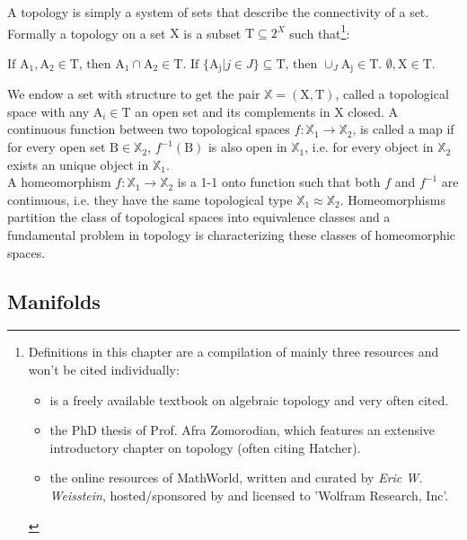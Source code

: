 A topology is simply a system of sets that describe the connectivity of a set.
Formally a topology on a set $\mathrm{X}$ is a subset $\mathrm{T} \subseteq 2^{X}$ such that\footnote{ Definitions in this chapter are a compilation of mainly three resources and won't be cited individually:\begin{itemize}
\item \citep[][]{Hatcher2002} is a freely available textbook on algebraic topology and very often cited.
\item \citep[][]{Zomorodian1996} the PhD thesis of Prof. Afra Zomorodian, which features an extensive introductory chapter on topology (often citing Hatcher).
\item \citep[][]{Weisstein2002} the online resources of MathWorld, written and curated by \textit{Eric W. Weisstein}, hosted/sponsored by and licensed to 'Wolfram Research, Inc'.\end{itemize}}:
\begin{enumerate} \setlength{\itemsep}{0cm} \setlength{\parskip}{0cm}
	\Item $\text{If } \mathrm{A_{1}}, \mathrm{A_{2}} \in \mathrm{T} \text{, then } \mathrm{A_{1}} \cap \mathrm{A_{2}} \in \mathrm{T}.$
	\Item $\text{If } \{\mathrm{A_{j}} | j \in J\} \subseteq \mathrm{T} \text{, then } \cup_{J} \mathrm{A_{j}} \in \mathrm{T}.$
	\Item $\emptyset, \mathrm{X} \in \mathrm{T}.$
\end{enumerate}
We endow a set with structure to get the pair $\mathbb{X} = (\mathrm{X},\mathrm{T})$, called a topological space with any $\mathrm{A}_{i} \in \mathrm{T}$ an open set and its complements in $\mathrm{X}$ closed.
A continuous function between two topological spaces $f: \mathbb{X}_{1} \rightarrow \mathbb{X}_{2}$, is called a map if for every open set $\mathrm{B} \in \mathbb{X}_{2}$, $f^{-1}(\mathrm{B})$ is also open in $\mathbb{X}_{1}$, i.e. for every object in $\mathbb{X}_{2}$ exists an unique object in $\mathbb{X}_{1}$.\\
A homeomorphism $f: \mathbb{X}_{1} \rightarrow \mathbb{X}_{2}$ is a 1-1 onto function such that both $f$ and $f^{-1}$ are continuous, i.e. they have the same topological type $\mathbb{X}_{1} \approx \mathbb{X}_{2}$.
Homeomorphisms partition the class of topological spaces into equivalence classes and a fundamental problem in topology is characterizing these classes of homeomorphic spaces.

\subsection{Manifolds}
\label{math_manifolds}


